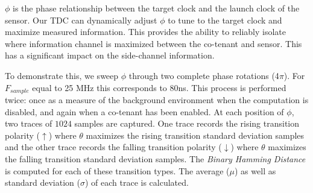 

$\phi$ is the phase relationship between the target clock and the launch clock of the sensor.
Our \name TDC can dynamically adjust $\phi$ to tune to the target clock and maximize measured information.
This provides the ability to reliably isolate where information channel is maximized between the co-tenant and sensor.
This has a significant impact on the side-channel information.

To demonstrate this, we sweep $\phi$ through two complete phase rotations (4$\pi$).
For $F_{sample}$ equal to 25 MHz this corresponds to 80ns.
This process is performed twice: once as a measure of the background environment when the computation is disabled, and again when a co-tenant has been enabled.
At each position of $\phi$, two traces of $1024$ samples are captured.
One trace records the rising transition polarity ($\uparrow$) where $\theta$ maximizes the rising transition standard deviation samples and the other trace records the falling transition polarity ($\downarrow$) where $\theta$ maximizes the falling transition standard deviation samples.
The \textit{Binary Hamming Distance} is computed for each of these transition types.
The average ($\mu$) as well as standard deviation ($\sigma$) of each trace is calculated. 

